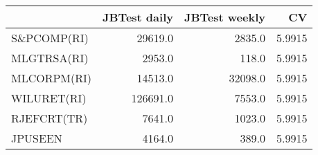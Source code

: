 \begin{tabular}{lrrr}
\toprule
{} &  JBTest daily &  JBTest weekly &      CV \\
\midrule
S\&PCOMP(RI) &       29619.0 &         2835.0 &  5.9915 \\
MLGTRSA(RI) &        2953.0 &          118.0 &  5.9915 \\
MLCORPM(RI) &       14513.0 &        32098.0 &  5.9915 \\
WILURET(RI) &      126691.0 &         7553.0 &  5.9915 \\
RJEFCRT(TR) &        7641.0 &         1023.0 &  5.9915 \\
JPUSEEN     &        4164.0 &          389.0 &  5.9915 \\
\bottomrule
\end{tabular}
